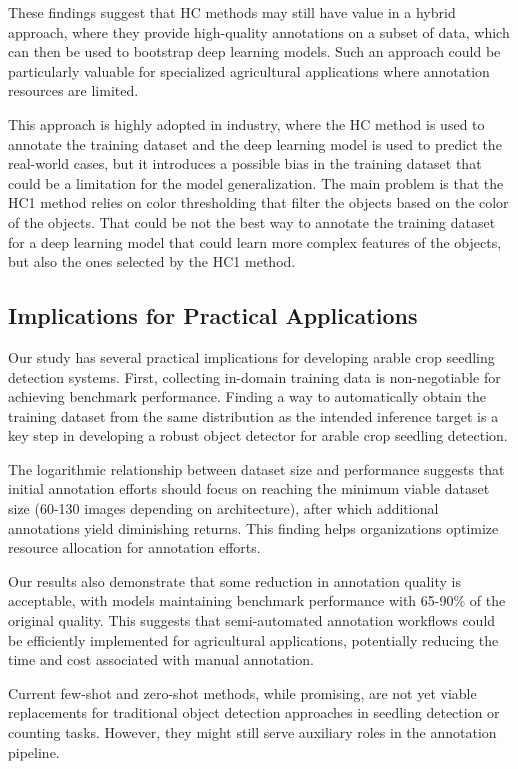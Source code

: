 \documentclass[12pt,a4paper,oneside]{report}
\begin{document}
These findings suggest that HC methods may still have value in a hybrid approach, where 
they provide high-quality annotations on a subset of data, which can then be used to 
bootstrap deep learning models. Such an approach could be particularly valuable for 
specialized agricultural applications where annotation resources are limited.

This approach is highly adopted in industry, where the HC method is used to
annotate the training dataset and the deep learning model is used to predict the real-world
cases, but it introduces a possible bias in the training dataset that could be a limitation
for the model generalization. The main problem is that the HC1 method relies
on color thresholding that filter the 
objects based on the color of the objects. That could be not the best
way to annotate the training dataset for a deep learning model that could learn
more complex features of the objects, but also the ones selected by the HC1 method.

\subsection{Implications for Practical Applications}
Our study has several practical implications for developing arable crop seedling detection systems.
First, collecting in-domain training data is non-negotiable for achieving benchmark performance. 
Finding a way to automatically obtain the training dataset from the same distribution as the intended 
inference target is a key step in developing a robust object detector for arable crop seedling detection.

The logarithmic relationship between dataset size and performance suggests that initial annotation 
efforts should focus on reaching the minimum viable dataset size (60-130 images depending on architecture), 
after which additional annotations yield diminishing returns. This finding helps organizations optimize 
resource allocation for annotation efforts.

Our results also demonstrate that some reduction in annotation quality is acceptable, with models 
maintaining benchmark performance with 65-90\% of the original quality. This suggests that semi-automated 
annotation workflows could be efficiently implemented for agricultural applications, potentially reducing 
the time and cost associated with manual annotation.

Current few-shot and zero-shot methods, while promising, are not yet viable replacements for traditional 
object detection approaches in seedling detection or counting tasks. However, they might still serve 
auxiliary roles in the annotation pipeline.
\end{document}
